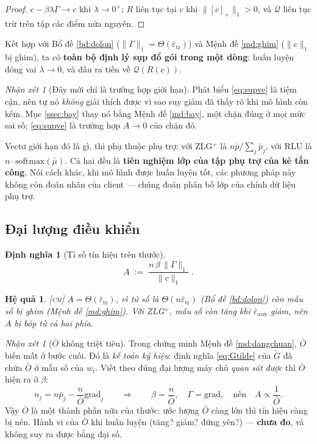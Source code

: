 \documentclass[11pt,a4paper]{article}
\newtheorem{hequa}[dinhly]{Hệ quả}
\newtheorem{dinhnghia}[dinhly]{Định nghĩa}
\theoremstyle{remark}
\newtheorem{nhanxet}[dinhly]{Nhận xét}
\newcommand{\pos}[1]{\left[#1\right]_+}
\newcommand{\quant}{\mathcal{Q}}
\newcommand{\epstr}{\bar\varepsilon_{\mathrm{tr}}}
\newcommand{\epsaux}{\bar\varepsilon_{\mathrm{aux}}}
\begin{document}
\begin{proof}
$c-\beta\lambda\Gamma\to c$ khi $\lambda\to0^+$; $R$ liên tục tại $c$ khi
$\|\pos{c}\|_1>0$, và $\quant$ liên tục trừ trên tập các điểm nửa nguyên.
\end{proof}

Kết hợp với Bổ đề \ref{bd:dolon} ($\|\Gamma\|_1=\Theta(\epstr)$) và Mệnh đề
\ref{md:ghim} ($\|c\|_1$ bị ghim), ta có \textbf{toàn bộ định lý sụp đổ gói
trong một dòng}: huấn luyện đóng vai $\lambda\to0$, và đầu ra tiến về
$\quant(R(c))$.

\begin{nhanxet}[Đây mới chỉ là trường hợp giới hạn]
\label{nx:chigioihan}
Phát biểu \eqref{eq:supve} là tiệm cận, nên tự nó \emph{không} giải thích
được vì sao suy giảm đã thấy rõ khi mô hình còn kém. Mục \ref{ssec:bay} thay
nó bằng Mệnh đề \ref{md:bay}, một chặn đúng ở mọi mức sai số; \eqref{eq:supve}
là trường hợp $A\to0$ của chặn đó.
\end{nhanxet}

Vectơ giới hạn đó là gì, thì phụ thuộc phụ trợ: với ZLG$^+$ là
$n\bar p/\sum_j\bar p_j$, với RLU là $n\cdot\mathrm{softmax}(\bar\mu)$. Cả hai
đều là \textbf{tiên nghiệm lớp của tập phụ trợ của kẻ tấn công}. Nói cách
khác, khi mô hình được huấn luyện tốt, các phương pháp này không còn đoán
nhãn của client --- chúng đoán phân bố lớp của chính dữ liệu phụ trợ.

\subsection{Đại lượng điều khiển}

\begin{dinhnghia}[Tỉ số tín hiệu trên thước]
\label{dn:A}
\begin{equation}
A \;:=\; \frac{n\,\beta\,\|\Gamma\|_1}{\|c\|_1}\;.
\label{eq:A}
\end{equation}
\end{dinhnghia}

\begin{hequa}
\label{hq:Aeps}
\textsc{[cm]}\; $A=\Theta(\epstr)$, vì tử số là $\Theta(n\epstr)$ (Bổ đề
\ref{bd:dolon}) còn mẫu số bị ghim (Mệnh đề \ref{md:ghim}). Với ZLG$^+$, mẫu
số còn \emph{tăng} khi $\epsaux$ giảm, nên $A$ bị bóp từ cả hai phía.
\end{hequa}

\begin{nhanxet}[$\bar O$ không triệt tiêu]
\label{nx:Obar}
Trong chứng minh Mệnh đề \ref{md:dangchuan}, $\bar O$ biến mất ở bước cuối.
Đó là \emph{kế toán ký hiệu}: định nghĩa \eqref{eq:Gtilde} của $\tilde G$ đã
chứa $\bar O$ ở mẫu số của $w_i$. Viết theo đúng đại lượng máy chủ
\emph{quan sát được} thì $\bar O$ hiện ra ở $\beta$:
\[
n_j=n\bar p_j-\frac{n}{\bar O}\mathrm{grad}_j
\qquad\Longrightarrow\qquad
\beta=\frac{n}{\bar O},\quad \Gamma=\mathrm{grad},
\quad\text{nên}\quad A\propto\frac{1}{\bar O}.
\]
Vậy $\bar O$ là một thành phần nữa của thước: ước lượng $\bar O$ càng lớn thì
tín hiệu càng bị nén. Hành vi của $\bar O$ khi huấn luyện (tăng? giảm? đứng
yên?) --- \textbf{chưa đo}, và không suy ra được bằng đại số.
\end{nhanxet}
\end{document}
